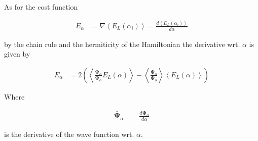 As for the cost function 

\begin{align}
    \bar{E}_\alpha &= \nabla \left\langle E_L (\alpha_i) \right\rangle = \frac{d\left\langle E_L (\alpha_i) \right\rangle}{d\alpha}
\end{align}

by the chain rule and the hermiticity of the Hamiltonian the derivative wrt. $\alpha$ is given by

\begin{align}
    \bar{E}_\alpha &= 2\left( \left\langle \frac{\bar{\mathbf{\Psi}}_\alpha}{\mathbf{\Psi}_\alpha} E_L(\alpha) \right\rangle - \left\langle \frac{\bar{\mathbf{\Psi}}_\alpha}{\mathbf{\Psi}_\alpha}  \right\rangle \left\langle E_L(\alpha) \right\rangle \right)
\end{align}

Where

\begin{align}
    \bar{\mathbf{\Psi}}_\alpha &= \frac{d \mathbf{\Psi}_\alpha}{d\alpha}
\end{align}

is the derivative of the wave function wrt. $\alpha$.
